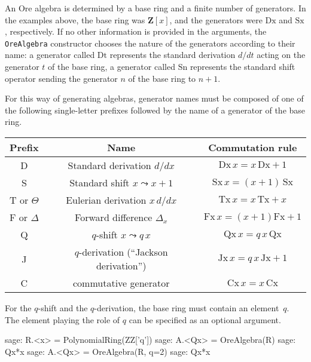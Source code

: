 \documentclass[11pt]{amsart}
\def\Bold#1{\mathbf{#1}}
\begin{document}
An Ore algebra is determined by a base ring and a finite number of generators.
In the examples above, the base ring was $\Bold{Z}[x]$, and the generators were
$\mathrm{Dx}$ and $\mathrm{Sx}$, respectively. If no other information is provided
in the arguments, the \verb|OreAlgebra| constructor chooses the nature of the 
generators according to their name: a generator called $\mathrm{Dt}$ represents
the standard derivation $d/dt$ acting on the generator $t$ of the base ring, 
a generator called $\mathrm{Sn}$ represents the standard shift operator sending the
generator $n$ of the base ring to $n+1$. 

For this way of generating algebras, generator names must be composed of
one of the following single-letter prefixes followed by the name of a generator
of the base ring. 

\begin{center}
  \begin{tabular}{|c|c|c|}\hline
    Prefix & Name & Commutation rule \\\hline
     D & Standard derivation $d/dx$ & $\mathrm{Dx}\,x=x\,\mathrm{Dx}+1$ \\
     S & Standard shift $x\leadsto x+1$ & $\mathrm{Sx}\,x=(x+1)\,\mathrm{Sx}$ \\
     T or $\Theta$ & Eulerian derivation $x\,d/dx$ & $\mathrm{Tx}\,x=x\,\mathrm{Tx}+x$ \\
     F or $\Delta$ & Forward difference $\Delta_x$ & $\mathrm{Fx}\,x=(x+1)\mathrm{Fx}+1$ \\
     Q & $q$-shift $x\leadsto q\,x$ & $\mathrm{Qx}\,x=q\,x\,\mathrm{Qx}$ \\
     J & $q$-derivation (``Jackson derivation'') & $\mathrm{Jx}\,x=q\,x\,\mathrm{Jx}+1$ \\ 
     C & commutative generator & $\mathrm{Cx}\,x = x\,\mathrm{Cx}$ \\\hline
  \end{tabular}
\end{center}

For the $q$-shift and the $q$-derivation, the base ring must contain an element~$q$.
The element playing the role of $q$ can be specified as an optional argument. 

\begin{sageexample}
  sage: R.<x> = PolynomialRing(ZZ['q'])
  sage: A.<Qx> = OreAlgebra(R)
  sage: Qx*x
  sage: A.<Qx> = OreAlgebra(R, q=2)
  sage: Qx*x
\end{sageexample}
\end{document}
